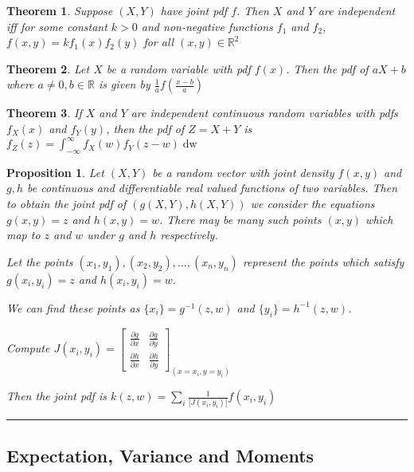 \documentclass[14pt,twoside]{extreport}
\newcommand{\hhrule}{\vspace{1cm}\hrule\vspace{1cm}}
\theoremstyle{dotless}
\newtheorem*{thm}{\footnotesize Theorem} %
\newtheorem*{prop}{\footnotesize Proposition} %
\begin{document}
\begin{thm}
    Suppose $(X,Y)$ have joint pdf $f$. Then $X$ and $Y$ are independent iff for some constant $k > 0$ and non-negative functions $f_1$ and $f_2$, $f(x,y) = k f_1(x)f_2(y)$ for all $(x,y) \in \mathbb{R}^2$
\end{thm}

\begin{thm}
    Let $X$ be a random variable with pdf $f(x)$. Then the pdf of $aX+b$ where $a \neq 0, b \in \mathbb{R}$ is given by $\displaystyle \frac{1}{a} f \left (\frac{x-b}{a} \right)$
\end{thm}

\begin{thm}
    If $X$ and $Y$ are independent continuous random variables with pdfs $f_X(x)$ and $f_Y(y)$, then the pdf of $Z = X+Y$ is $f_Z\left (z\right ) = \displaystyle\int_{- \infty}^\infty f_X \left (w\right ) f_Y \left (z - w\right ) \mathop{\mathrm{d} w}$
\end{thm}

\begin{prop}
    Let $(X,Y)$ be a random vector with joint density $f(x,y)$ and $g,h$ be continuous and differentiable real valued functions of two variables. Then to obtain the joint pdf of $(g(X,Y), h(X,Y))$ we consider the equations $g(x,y) = z$ and $h(x,y) = w$. There may be many such points $(x,y)$ which map to $z$ and $w$ under $g$ and $h$ respectively.

    Let the points $(x_1, y_1), (x_2, y_2), ..., (x_n, y_n)$ represent the points which satisfy $g(x_i, y_i) = z$ and $h(x_i, y_i) = w$.

    We can find these points as $\{x_i\} = g^{-1}(z,w)$ and $\{ y_i \} = h^{-1}(z,w)$.

    Compute $J(x_i, y_i) = \begin{bmatrix} \frac{\partial g}{\partial x} & \frac{\partial g}{\partial y} \\ \frac{\partial h}{\partial x} & \frac{\partial h}{\partial y} \end{bmatrix}_{(x = x_i, y = y_i)}$

        Then the joint pdf is $k(z,w) = \displaystyle \sum_i \frac{1}{|J(x_i, y_i)|} f(x_i, y_i)$
\end{prop}

\hhrule
\subsection*{Expectation, Variance and Moments}
\end{document}
